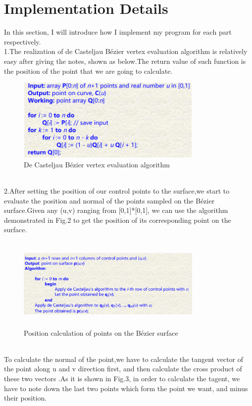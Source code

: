 \documentclass[acmtog]{acmart}
\begin{document}
\section{Implementation Details}
\qquad In this section, I will introduce how I implement my program for each part respectively.
\\\indent 1.The realization of de Casteljau Bézier vertex evaluation algorithm is relatively easy after giving the notes, shown as below.The return value of such function is the position of the point that we are going to calculate.
\begin{figure}[h]
	\centering
	\includegraphics[width=9cm,height=4cm]{algorithm1.PNG}
	\caption{De Casteljau Bézier vertex evaluation algorithm}
\end{figure}
\\\indent 2.After setting the position of our control points to the surface,we start to evaluate the position and normal of the points sampled on the Bézier surface.Given any (u,v) ranging from [0,1]*[0,1], we can use the  algorithm demonstrated in Fig.2 to get the position of its corresponding point on the surface.
\begin{figure}[h]
	\centering
	\includegraphics[width=9cm,height=4.5cm]{algorithm2.PNG}
	\caption{Position calculation of points on the Bézier surface}
\end{figure}
\\\indent To calculate the normal of the point,we have to calculate the tangent vector of the point along u and v direction first, and then calculate the cross product of these two vectors .As it is shown in Fig.3, in order to calculate the tagent, we have to note down the last two points which form the point we want, and minus their position. 
\end{document}
